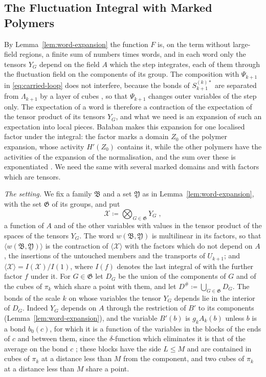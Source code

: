 \documentclass[11pt]{preprint}
\numberwithin{equation}{section}
\theoremstyle{definition}
\theoremstyle{remark}
\theoremstyle{plain}
\begin{document}
\subsection{The Fluctuation Integral with Marked Polymers}\label{sec:marked-polymers}

By Lemma~\ref{lem:word-expansion} the function $F$ is, on the term without large-field regions, a finite sum of numbers times words, and in each word only the tensors $Y_G$ depend on the field $A$ which the step integrates, each of them through the fluctuation field on the components of its group. The composition with $\Psi_{k+1}$ in \eqref{eq:carried-loop} does not interfere, because the bonds of $S_{k+1}^{(k)*}$ are separated from $\Lambda_{k+1}$ by a layer of cubes \cite[(3.20), p.~269]{BalabanCRE}, so that $\Psi_{k+1}$ changes outer variables of the step only. The expectation of a word is therefore a contraction of the expectation of the tensor product of its tensors $Y_G$, and what we need is an expansion of such an expectation into local pieces. Ba{\l}aban makes this expansion for one localised factor under the integral: the factor marks a domain $Z_0$ of the polymer expansion, whose activity $H'(Z_0)$ contains it, while the other polymers have the activities of the expansion of the normalisation, and the sum over these is exponentiated \cite[(3.44)--(3.46), pp.~277--278]{BalabanCRE}. We need the same with several marked domains and with factors which are tensors.

\emph{The setting.} We fix a family $\mathfrak B$ and a set $\mathfrak Y$ as in Lemma~\ref{lem:word-expansion}, with the set $\mathfrak G$ of its groups, and put
\begin{equation}\label{eq:tensor-product}
    \mathcal X \coloneqq \bigotimes_{G \in \mathfrak G}Y_G\;,
\end{equation}
a function of $A$ and of the other variables with values in the tensor product of the spaces of the tensors $Y_G$. The word $w(\mathfrak B, \mathfrak Y)$ is multilinear in its factors, so that $\langle w(\mathfrak B, \mathfrak Y)\rangle$ is the contraction of $\langle\mathcal X\rangle$ with the factors which do not depend on $A$, the insertions of the untouched members and the transports of $U_{k+1}$; and $\langle\mathcal X\rangle = I(\mathcal X)/I(1)$, where $I(f)$ denotes the last integral of \cite[(3.25)]{BalabanCRE} with the further factor $f$ under it. For $G \in \mathfrak G$ let $D_G$ be the union of the components of $G$ and of the cubes of $\pi_k$ which share a point with them, and let $D^{\#} \coloneqq \bigcup_{G \in \mathfrak G}D_G$. The bonds of the scale $k$ on whose variables the tensor $Y_G$ depends lie in the interior of $D_G$. Indeed $Y_G$ depends on $A$ through the restriction of $B'$ to its components (Lemma~\ref{lem:word-expansion}), and the variable $B'(b)$ is $g_kA_k(b)$ unless $b$ is a bond $b_0(c)$, for which it is a function of the variables in the blocks of the ends of $c$ and between them, since the $\delta$-function which eliminates it is that of the average \cite[(0.4), p.~253]{BalabanRG1} on the bond $c$ \cite[pp.~267--268]{BalabanRG1}; these blocks have the side $L \leq M$ and are contained in cubes of $\pi_k$ at a distance less than $M$ from the component, and two cubes of $\pi_k$ at a distance less than $M$ share a point.
\end{document}
